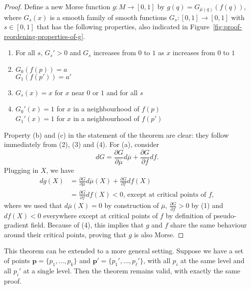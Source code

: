 \begin{proof}
    Define a new Morse function $g: M \to  [0,1]$ by $g(q) = G_{\overline{\mu}(q)}(f(q))$, where $G_{s}(x)$ is a smooth family of smooth functions $G_s: [0,1] \to  [0,1]$ with $s \in [0,1]$ that has the following properties, also indicated in Figure~\ref{fig:proof-reordening-properties-of-g}.
    \begin{marginfigure}
        \centering
        \caption{Necessary properties of $G$ in the proof on reordering critical points are indicated in yellow.}
        \label{fig:proof-reordening-properties-of-g}
    \end{marginfigure}
    \begin{enumerate}[(1)]
        \item For all $s$, $G_s' > 0$ and $G_s$ increases from $0$ to  $1$ as $x$ increases from  $0$ to  $1$
        \item  $G_0(f(p)) = a$\\ $G_1(f(p')) = a'$
        \item  $G_s(x) = x$ for $x$ near  $0$ or  $1$ and for all $s$ 
        \item  $G_0'(x) = 1$ for $x$  in a neighbourhood of $f(p)$\\
        $G_1'(x) = 1$ for $x$  in a neighbourhood of $f(p')$
    \end{enumerate}
    Property (b) and (c) in the statement of the theorem are clear: they follow immediately from (2), (3) and (4).
    For (a), consider
    \[
        dG = \frac{\partial G}{\partial \overline{\mu}}  d\overline{\mu} + \frac{\partial G}{\partial f}  df
    .\] 
    Plugging in $X$, we have
    \begin{align*}
        dg(X) &= \frac{\partial G}{\partial \overline{\mu}}  d\overline{\mu}(X) + \frac{\partial G}{\partial f}  df(X)\\
              &= \frac{\partial G}{\partial f}  df(X) < 0 \text{, except at critical points of $f$}
    ,\end{align*} 
    where we used that $d\overline{\mu}(X) = 0$ by construction of $\overline{\mu}$, $\frac{\partial G}{\partial f} > 0$ by (1) and $df(X) < 0$ everywhere except at critical points of $f$ by definition of pseudo-gradient field.
    Because of (4), this implies that $g$ and $f$ share the same behaviour around their critical points, proving that $g$ is also Morse.
\end{proof}

\begin{remark}
    This theorem can be extended to a more general setting. Suppose we have a set of points $\mathbf{p} = \{p_1, \ldots, p_k\}$ and $\mathbf{p}' = \{p_1', \ldots, p_\ell'\}$, with all $p_i$ at the same level and all $p_i'$ at a single level.
    Then the theorem remains valid, with exactly the same proof.
\end{remark}

